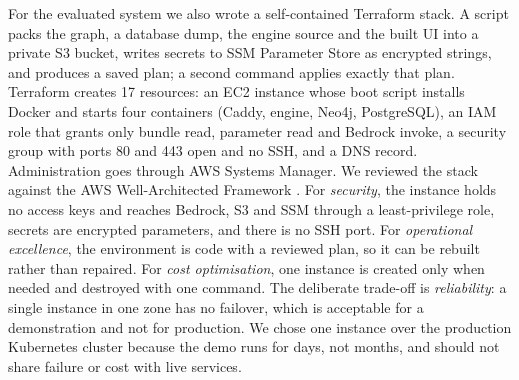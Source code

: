 \documentclass[12pt,onecolumn,draftclsnofoot]{IEEEtran}
\begin{document}
For the evaluated system we also wrote a self-contained Terraform stack. A script packs the graph, a database dump, the engine source and the built UI into a private S3 bucket, writes secrets to SSM Parameter Store as encrypted strings, and produces a saved plan; a second command applies exactly that plan. Terraform creates 17 resources: an EC2 instance whose boot script installs Docker and starts four containers (Caddy, engine, Neo4j, PostgreSQL), an IAM role that grants only bundle read, parameter read and Bedrock invoke, a security group with ports 80 and 443 open and no SSH, and a DNS record. Administration goes through AWS Systems Manager. We reviewed the stack against the AWS Well-Architected Framework \cite{aws2024wellarchitected}. For \emph{security}, the instance holds no access keys and reaches Bedrock, S3 and SSM through a least-privilege role, secrets are encrypted parameters, and there is no SSH port. For \emph{operational excellence}, the environment is code with a reviewed plan, so it can be rebuilt rather than repaired. For \emph{cost optimisation}, one instance is created only when needed and destroyed with one command. The deliberate trade-off is \emph{reliability}: a single instance in one zone has no failover, which is acceptable for a demonstration and not for production. We chose one instance over the production Kubernetes cluster because the demo runs for days, not months, and should not share failure or cost with live services.
\end{document}
